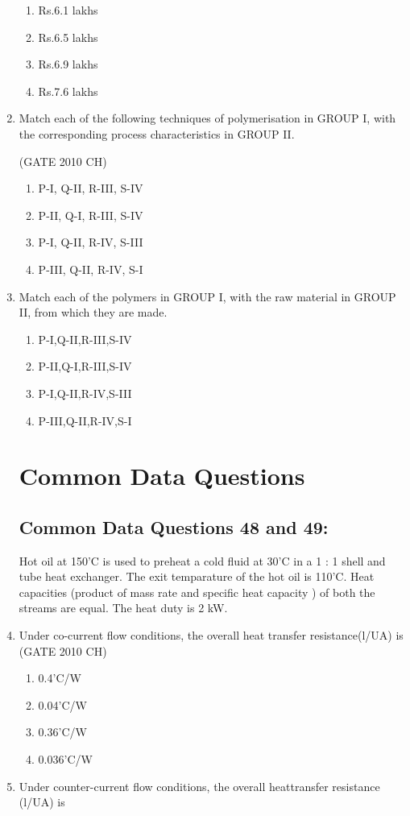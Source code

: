 \documentclass[journal,12pt,onecolumn]{exam}
\theoremstyle{remark}
\begin{document}
\begin{enumerate}
   \begin{enumerate}
       \item Rs.6.1 lakhs
       \item Rs.6.5 lakhs
       \item Rs.6.9 lakhs
       \item Rs.7.6 lakhs
   \end{enumerate}
\item 
Match each of the following techniques of polymerisation in GROUP I, with the corresponding process characteristics in GROUP II.

 
      
      
 \hfill{(GATE 2010 CH)}\\


\begin{enumerate}
    \item P-I, Q-II, R-III, S-IV
    \item P-II, Q-I, R-III, S-IV
    \item P-I, Q-II, R-IV, S-III
    \item P-III, Q-II, R-IV, S-I
\end{enumerate}
\item 
Match each of the polymers in GROUP I, with the raw material in GROUP II, from which they are made.

\begin{enumerate}
    \item P-I,Q-II,R-III,S-IV
    \item P-II,Q-I,R-III,S-IV
    \item P-I,Q-II,R-IV,S-III
    \item P-III,Q-II,R-IV,S-I
\end{enumerate}
\section{Common Data Questions}
\subsection{Common Data Questions 48 and 49:}

Hot oil at 150'C is used to preheat a cold fluid at 30'C in a  1 : 1 shell and tube heat exchanger. The exit temparature of the hot oil is 110'C. Heat capacities (product of mass rate and specific heat capacity ) of both the streams are equal. The heat duty is 2 kW.\\ 
\item 
  Under co-current flow conditions, the overall heat transfer resistance(l/UA) is
  \hfill{(GATE 2010 CH)}\\
  \begin{enumerate}
      \item 0.4'C/W
      \item 0.04'C/W
      \item 0.36'C/W
      \item 0.036'C/W
  \end{enumerate}
\item 
    Under counter-current flow conditions, the overall heattransfer resistance (l/UA) is
 

\end{enumerate}
\end{document}
